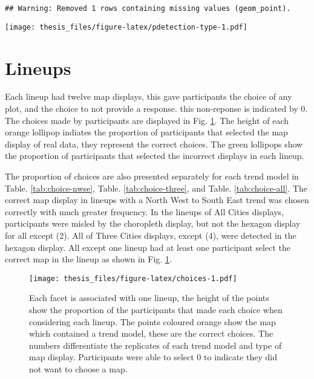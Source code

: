 \documentclass{monashthesis}
\begin{document}
\begin{verbatim}
## Warning: Removed 1 rows containing missing values (geom_point).
\end{verbatim}

\texttt{[image: thesis\_files/figure-latex/pdetection-type-1.pdf]}

\hypertarget{lineups}{%
\section{Lineups}\label{lineups}}

Each lineup had twelve map displays, this gave participants the choice of any plot, and the choice to not provide a response. this non-reponse is indicated by 0.
The choices made by participants are displayed in Fig. \ref{fig:choices}. The height of each orange lollipop indiates the proportion of participants that selected the map display of real data, they represent the correct choices.
The green lollipops show the proportion of participants that selected the incorrect displays in each lineup.

The proportion of choices are also presented separately for each trend model in Table. \ref{tab:choice-nwse}, Table. \ref{tab:choice-three}, and Table. \ref{tab:choice-all}.
The correct map display in lineups with a North West to South East trend was chosen correctly with much greater frequency.
In the lineups of All Cities displays, participants were misled by the choropleth display, but not the hexagon display for all except (2).
All of Three Cities displays, except (4), were detected in the hexagon display. All except one lineup had at least one participant select the correct map in the lineup as shown in Fig. \ref{fig:choices}.

\begin{figure}
\centering
\texttt{[image: thesis\_files/figure-latex/choices-1.pdf]}
\caption{\label{fig:choices}Each facet is associated with one lineup, the height of the points show the proportion of the participants that made each choice when considering each lineup. The points coloured orange show the map which contained a trend model, these are the correct choices. The numbers differentiate the replicates of each trend model and type of map display. Participants were able to select 0 to indicate they did not want to choose a map.}
\end{figure}
\end{document}
